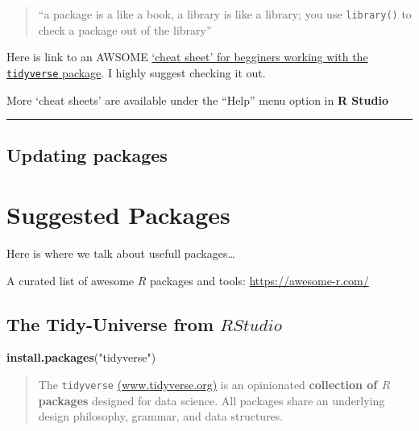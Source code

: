 \documentclass[]{book}
\newenvironment{Shaded}{\begin{snugshade}}{\end{snugshade}}
\newcommand{\KeywordTok}[1]{\textcolor[rgb]{0.13,0.29,0.53}{\textbf{#1}}}
\newcommand{\StringTok}[1]{\textcolor[rgb]{0.31,0.60,0.02}{#1}}
\newcommand{\NormalTok}[1]{#1}
\theoremstyle{definition}
\theoremstyle{definition}
\theoremstyle{definition}
\theoremstyle{remark}
\begin{document}
\begin{quote}
``a package is a like a book, a library is like a library; you use
\texttt{library()} to check a package out of the library''
\end{quote}

Here is link to an AWSOME
\href{http://datacamp-community.s3.amazonaws.com/e63a8f6b-2aa3-4006-89e0-badc294b179c}{`cheat
sheet' for begginers working with the \texttt{tidyverse} package}. I
highly suggest checking it out.

More `cheat sheets' are available under the ``Help'' menu option in
\textbf{R Studio}

\begin{center}\rule{0.5\linewidth}{\linethickness}\end{center}

\section{Updating packages}\label{updating-packages}

\chapter{Suggested Packages}\label{suggested-packages}

Here is where we talk about usefull packages\ldots{}

A curated list of awesome \(R\) packages and tools:
\url{https://awesome-r.com/}

\section{\texorpdfstring{The Tidy-Universe from
\(R Studio\)}{The Tidy-Universe from R Studio}}\label{the-tidy-universe-from-r-studio}

\begin{Shaded}
\begin{Highlighting}[]
\KeywordTok{install.packages}\NormalTok{(}\StringTok{"tidyverse"}\NormalTok{)}
\end{Highlighting}
\end{Shaded}

\begin{quote}
The \texttt{tidyverse}
\href{https://www.tidyverse.org/}{(www.tidyverse.org)} is an opinionated
\textbf{collection of \(R\) packages} designed for data science. All
packages share an underlying design philosophy, grammar, and data
structures.
\end{quote}
\end{document}
